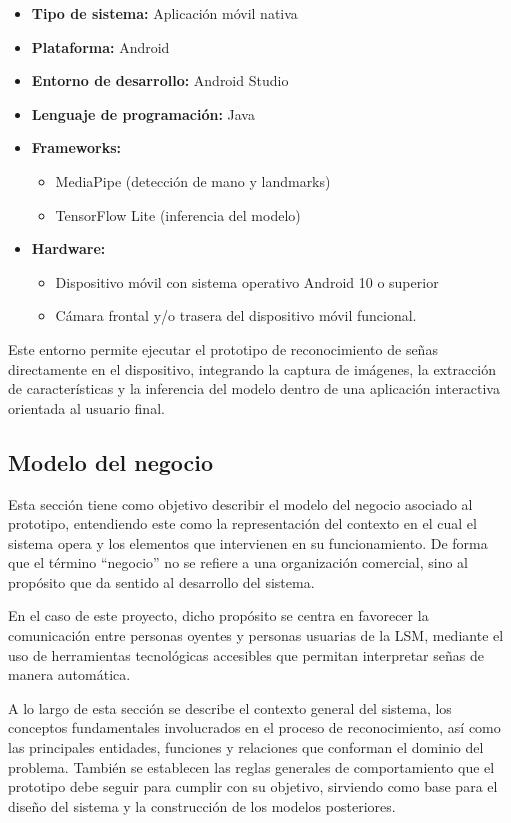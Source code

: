 	\begin{itemize}
		\item \textbf{Tipo de sistema:} Aplicación móvil nativa
		\item \textbf{Plataforma:} Android
		\item \textbf{Entorno de desarrollo:} Android Studio
		\item \textbf{Lenguaje de programación:} Java
		\item \textbf{Frameworks:}
		\begin{itemize}
			\item MediaPipe (detección de mano y landmarks)
			\item TensorFlow Lite (inferencia del modelo)
		\end{itemize}
		\item \textbf{Hardware:}
		\begin{itemize}
			\item Dispositivo móvil con sistema operativo Android 10 o superior
			\item Cámara frontal y/o trasera del dispositivo móvil funcional.
		\end{itemize}
	\end{itemize}
	
	Este entorno permite ejecutar el prototipo de reconocimiento de señas directamente en el dispositivo, integrando la captura de imágenes, la extracción de características y la inferencia del modelo dentro de una aplicación interactiva orientada al usuario final.
	
	\subsection{Modelo del negocio}
	
	Esta sección tiene como objetivo describir el modelo del negocio asociado al prototipo, entendiendo este como la representación del contexto en el cual el sistema opera y los elementos que intervienen en su funcionamiento. De forma que el término ``negocio'' no se refiere a una organización comercial, sino al propósito que da sentido al desarrollo del sistema.
	
	En el caso de este proyecto, dicho propósito se centra en favorecer la comunicación entre personas oyentes y personas usuarias de la LSM, mediante el uso de herramientas tecnológicas accesibles que permitan interpretar señas de manera automática.
	
	A lo largo de esta sección se describe el contexto general del sistema, los conceptos fundamentales involucrados en el proceso de reconocimiento, así como las principales entidades, funciones y relaciones que conforman el dominio del problema. También se establecen las reglas generales de comportamiento que el prototipo debe seguir para cumplir con su objetivo, sirviendo como base para el diseño del sistema y la construcción de los modelos posteriores.
	
